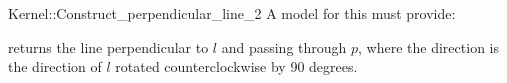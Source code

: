 \begin{ccRefFunctionObjectConcept}{Kernel::Construct_perpendicular_line_2}
A model for this must provide:


        {returns the line perpendicular to $l$ and passing through $p$,
         where the direction is the direction of $l$ rotated 
         counterclockwise by 90 degrees.}

\end{ccRefFunctionObjectConcept}
